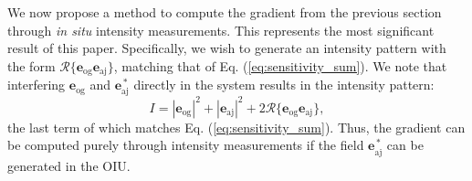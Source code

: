 We now propose a method to compute the gradient from the previous section through \textit{in situ} intensity measurements.  This represents the most significant result of this paper.  Specifically, we wish to generate an intensity pattern with the form $\mathcal{R}\big\{\mathbf{e}_\textrm{og} \mathbf{e}_\textrm{aj} \big\}$, matching that of Eq. (\ref{eq:sensitivity_sum}).  We note that interfering $\mathbf{e}_{\textrm{og}}$ and $\mathbf{e}_\textrm{aj}^{\,*}$ directly in the system results in the intensity pattern:
\begin{equation}
I = |\mathbf{e}_\textrm{og}|^2 + |\mathbf{e}_\textrm{aj}|^2 + 2\mathcal{R}\big\{\mathbf{e}_\textrm{og}\mathbf{e}_{\textrm{aj}} \big\},
\label{eq:intensity_correct}
\end{equation}
the last term of which matches Eq. (\ref{eq:sensitivity_sum}). Thus, the gradient can be computed purely through intensity measurements if the field $\mathbf{e}_\textrm{aj}^{\,*}$ can be generated in the OIU.

